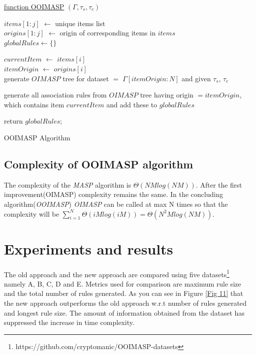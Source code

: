 \documentclass[5p, twocolumn]{elsarticle}
\begin{document}
\begin{algorithm}

    \underline{function OOIMASP} $ (\Gamma, \tau _{s}, \tau _{c}) $\;
       
    $ items[1:j] $ $ \leftarrow $ unique items list \\
    $ origins[1:j] $ $ \leftarrow $ origin of corresponding items in $ items $ \\       
    $ globalRules \leftarrow \lbrace \rbrace $
       
	  {
		$ currentItem $ $ \leftarrow $ $ items[i] $ \\
		$ itemOrigin $ $ \leftarrow $ $ origins[i] $ \\
			  	
      	  {
            generate $ OIMASP $ tree for dataset $ = $ $ \Gamma[itemOrigin:N] $ and given $ \tau _{s} $, $ 				\tau _{c} $
          }	
          
		generate all association rules from $ OIMASP $ tree having origin $ = itemOrigin $, which contains 			item $ currentItem $ and add these to $ globalRules $
	  }
	          		
	return $ globalRules $;      
    \caption{OOIMASP Algorithm}
\end{algorithm}

\subsection{Complexity of OOIMASP algorithm}
The complexity of the \emph{MASP} algorithm \cite{oldmasp} is $ \Theta(NMlog(NM)) $. After the first improvement(OIMASP) complexity remains the same. In the concluding algorithm(\emph{OOIMASP}) \emph{OIMASP} can be called at max N times so that the complexity will be $ \displaystyle\sum_{i=1}^{N} \Theta(iMlog(iM)) = \Theta(N^{2}Mlog(NM)) $.

\section{Experiments and results}

The old approach and the new approach are compared using five datasets\footnote{\label{datasetlink} https://github.com/cryptomanic/OOIMASP-datasets} namely A, B, C, D and E. Metrics used for comparison are maximum rule size and the total number of rules generated. As you can see in Figure \ref{Fig 11} that the new approach outperforms the old approach w.r.t number of rules generated and longest rule size. The amount of information obtained from the dataset has suppressed the increase in time complexity.
\end{document}
